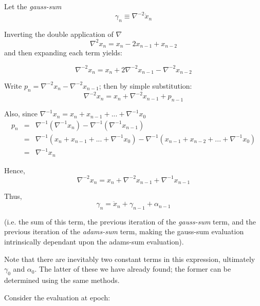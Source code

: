 Let the \textit{gauss-sum} 
\begin{equation}
\gamma _{n} \equiv \nabla ^{-2} \ddot{x}_{n}
\end{equation}

Inverting the double application of $\nabla $ 
\begin{equation*}
\nabla ^2 x_n = x_n - 2 x_{n-1} + x_{n-2}
\end{equation*}
and then expanding each term yields:
 

\begin{equation} \label{eq:del2_xn_1}
\nabla ^{-2} x_n = x_{n} + 2\nabla ^{-2}x_{n-1} - \nabla ^{-2}x_{n-2}
\end{equation}

Write  $p_{n}=\nabla ^{-2}x_{n}-\nabla ^{-2}x_{n-1}$; then by simple substitution: 
\begin{equation*}
\nabla ^{-2}x_{n} = x_{n}+\nabla ^{-2}x_{n-1}+p_{n-1}
\end{equation*}

Also, since $\nabla ^{-1}x_{n}=x_{n}+x_{n-1}+...+\nabla ^{-1}x_{0}$ 
\begin{eqnarray*}
p_{n} & = &\nabla ^{-1}(\nabla ^{-1}x_{n})-\nabla ^{-1}(\nabla ^{-1}x_{n-1}) \\
 & = & \nabla ^{-1}(x_{n}+x_{n-1}+...+\nabla ^{-1}x_{0})- \nabla ^{-1}
        (x_{n-1}+x_{n-2}+...+\nabla ^{-1}x_{0})\\
 & = & \nabla ^{-1}x_n
\end{eqnarray*}

Hence, 
\begin{equation} \label{eq:del2_xn}
\nabla ^{-2}x_{n} = x_{n}+\nabla ^{-2}x_{n-1}+\nabla ^{-1}x_{n-1}
\end{equation}

Thus, 
\begin{equation}
\gamma_n = \ddot{x}_n + \gamma_{n-1} + \alpha_{n-1}
\end{equation}

(i.e. the sum of this term, the previous iteration of the
\textit{gauss-sum} term, and the previous iteration of the
\textit{adams-sum }term, making the gauss-sum evaluation
intrinsically dependant upon the adams-sum evaluation).

Note that there are inevitably two constant terms in this expression,
ultimately $\gamma_0$ and $\alpha_0$.  The latter of these we have already
found; the former can be determined using the same methods.

Consider the evaluation at epoch:


